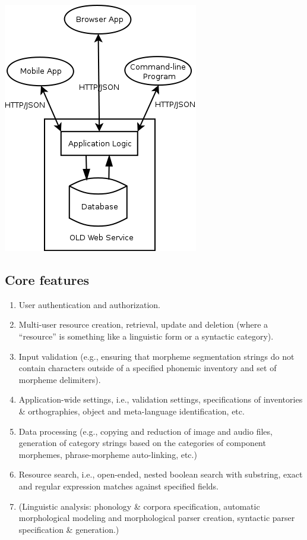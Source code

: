 \documentclass[letterpaper,10pt,english]{sphinxmanual}
\begin{document}
{\hfill\includegraphics{OLD_diagram_high_level.png}\hfill}


\subsection{Core features}
\label{about:core-features}\begin{enumerate}
\item {} 
User authentication and authorization.

\item {} 
Multi-user resource creation, retrieval, update and deletion (where a
``resource'' is something like a linguistic form or a syntactic category).

\item {} 
Input validation (e.g., ensuring that morpheme segmentation strings do not
contain characters outside of a specified phonemic inventory and set of
morpheme delimiters).

\item {} 
Application-wide settings, i.e., validation settings, specifications of
inventories \& orthographies, object and meta-language identification, etc.

\item {} 
Data processing (e.g., copying and reduction of image and audio files,
generation of category strings based on the categories of component
morphemes, phrase-morpheme auto-linking, etc.)

\item {} 
Resource search, i.e., open-ended, nested boolean search with substring,
exact and regular expression matches against specified fields.

\item {} 
(Linguistic analysis: phonology \& corpora specification, automatic
morphological modeling and morphological parser creation, syntactic parser
specification \& generation.)

\end{enumerate}
\end{document}

